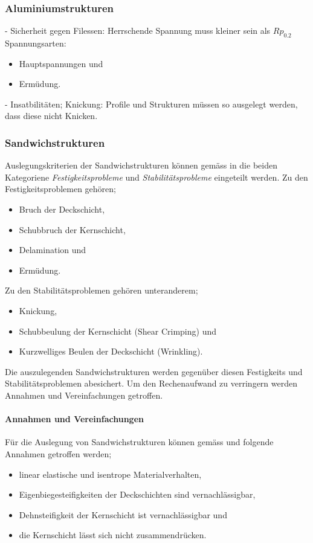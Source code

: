   \subsubsection{Aluminiumstrukturen}
  - Sicherheit gegen Filessen: Herrschende Spannung muss kleiner sein als $Rp_{0.2}$\\
  Spannungsarten:
  \begin{itemize}
    \item Hauptspannungen und
    \item Ermüdung.
  \end{itemize}
  - Insatbilitäten; Knickung: Profile und Strukturen müssen so ausgelegt werden, dass diese nicht Knicken.\\

  \subsubsection{Sandwichstrukturen}
  Auslegungskriterien der Sandwichstrukturen können gemäss \cite{ETH} in die beiden Kategoriene \emph{Festigkeitsprobleme} und \emph{Stabilitätsprobleme} eingeteilt werden. Zu den Festigkeitsproblemen gehören;
  \begin{itemize}
    \item Bruch der Deckschicht,
    \item Schubbruch der Kernschicht,
    \item Delamination und
    \item Ermüdung.
  \end{itemize}

  Zu den Stabilitätsproblemen gehören unteranderem;
  \begin{itemize}
    \item Knickung,
    \item Schubbeulung der Kernschicht (Shear Crimping) und
    \item Kurzwelliges Beulen der Deckschicht (Wrinkling).
  \end{itemize}

  Die auszulegenden Sandwichstrukturen werden gegenüber diesen Festigkeits und Stabilitätsproblemen abesichert. Um den Rechenaufwand zu verringern werden Annahmen und Vereinfachungen getroffen.

    \paragraph{Annahmen und Vereinfachungen}
    Für die Auslegung von Sandwichstrukturen können gemäss \cite{ETH} und \cite{klein} folgende Annahmen getroffen werden;
    \begin{itemize}
      \item linear elastische und isentrope Materialverhalten,
      \item Eigenbiegesteifigkeiten der Deckschichten sind vernachlässigbar,
      \item Dehnsteifigkeit der Kernschicht ist vernachlässigbar und
      \item die Kernschicht lässt sich nicht zusammendrücken.
    \end{itemize}

